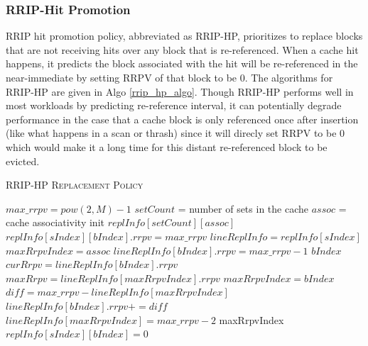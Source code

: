 \documentclass[conference]{IEEEtran}
\begin{document}
\subsubsection{RRIP-Hit Promotion}
RRIP hit promotion policy, abbreviated as RRIP-HP, prioritizes to replace blocks that are not receiving hits over any block that is re-referenced. When a cache hit happens, it predicts the block associated with the hit will be re-referenced in the near-immediate by setting RRPV of that block to be 0. The algorithms for RRIP-HP are given in Algo \ref{rrip_hp_algo}. Though RRIP-HP performs well in most workloads by predicting re-reference interval, it can potentially degrade performance in the case that a cache block is only referenced once after insertion (like what happens in a scan or thrash) since it will direcly set RRPV to be 0 which would make it a long time for this distant re-referenced block to be evicted.
\begin{algorithm}[!htp]
  \caption{\textsc{RRIP-HP Replacement Policy}}
  \label{rrip_hp_algo}
  \begin{algorithmic}
	\State $max\_rrpv = pow(2, M) - 1$
	\State $setCount$ = number of sets in the cache
	\State $assoc$ = cache associativity
	\State init $replInfo[setCount][assoc]$
			\State $replInfo[sIndex][bIndex].rrpv = max\_rrpv$
		\EndFor
	\EndFor
  \EndFunction
	\State $lineReplInfo = replInfo[sIndex]$
	\State $maxRrpvIndex = assoc$
			\State $lineReplInfo[bIndex].rrpv = max\_rrpv - 1$
			\State \Return $bIndex$
		\EndIf
		\State $curRrpv = lineReplInfo[bIndex].rrpv$
		\State $maxRrpv = lineReplInfo[maxRrpvIndex].rrpv$
			\State $maxRrpvIndex = bIndex$
		\EndIf
	\EndFor
	\State $diff = max\_rrpv - lineReplInfo[maxRrpvIndex]$
		\State $lineReplInfo[bIndex].rrpv += diff$
	\EndFor
	\State $lineReplInfo[maxRrpvIndex] = max\_rrpv - 2$
	\State \Return maxRrpvIndex
  \EndFunction
		\State $replInfo[sIndex][bIndex] = 0$
	\EndIf
	\State {}
  \EndFunction
  \end{algorithmic}
\end{algorithm}
\end{document}

